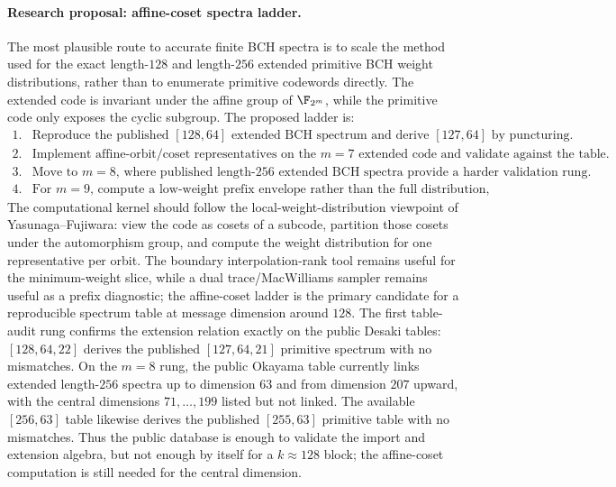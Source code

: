 \paragraph{Research proposal: affine-coset spectra ladder.}
The most plausible route to accurate finite BCH spectra is to scale the method used for the exact length-\(128\) and
length-\(256\) extended primitive BCH weight distributions, rather than to enumerate primitive codewords directly.
The extended code is invariant under the affine group of \(\F_{2^m}\), while the primitive code only exposes the cyclic
subgroup.  The proposed ladder is:
\[
\begin{array}{ll}
1. & \text{Reproduce the published }[128,64]\text{ extended BCH spectrum and derive }[127,64]\text{ by puncturing.}\\
2. & \text{Implement affine-orbit/coset representatives on the }m=7\text{ extended code and validate against the table.}\\
3. & \text{Move to }m=8\text{, where published length-}256\text{ extended BCH spectra provide a harder validation rung.}\\
4. & \text{For }m=9\text{, compute a low-weight prefix envelope rather than the full distribution, using nested subcodes.}
\end{array}
\]
The computational kernel should follow the local-weight-distribution viewpoint of Yasunaga--Fujiwara: view the code as
cosets of a subcode, partition those cosets under the automorphism group, and compute the weight distribution for one
representative per orbit.  The boundary interpolation-rank tool remains useful for the minimum-weight slice, while a
dual trace/MacWilliams sampler remains useful as a prefix diagnostic; the affine-coset ladder is the primary candidate
for a reproducible spectrum table at message dimension around \(128\).
The first table-audit rung confirms the extension relation exactly on the public Desaki tables:
\([128,64,22]\) derives the published \([127,64,21]\) primitive spectrum with no mismatches.  On the \(m=8\) rung, the
public Okayama table currently links extended length-\(256\) spectra up to dimension \(63\) and from dimension \(207\)
upward, with the central dimensions \(71,\ldots,199\) listed but not linked.  The available \([256,63]\) table likewise
derives the published \([255,63]\) primitive table with no mismatches.  Thus the public database is enough to validate
the import and extension algebra, but not enough by itself for a \(k\approx128\) block; the affine-coset computation is
still needed for the central dimension.
